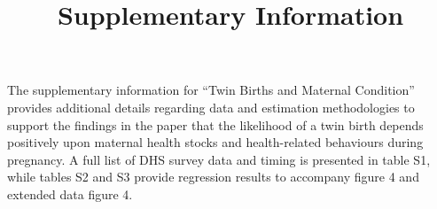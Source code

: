 \documentclass{nature}
\title{Supplementary Information}
\begin{document}
\maketitle

\begin{linenumbers}

The supplementary information for ``Twin Births and Maternal Condition'' provides additional details regarding data and estimation methodologies to support the findings in the paper that the likelihood of a twin birth depends positively upon maternal health stocks and health-related behaviours during pregnancy. A full list of DHS survey data and timing is presented in table S1, while tables S2 and S3 provide regression results to accompany figure 4 and extended data figure 4.



\clearpage
\begin{spacing}{1}

\begin{landscape}

\end{landscape}
\begin{landscape}

\end{landscape}



\end{spacing}
\end{linenumbers}
\end{document}
